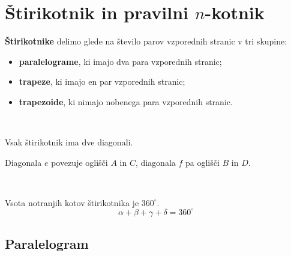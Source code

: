 \newpage

    \section{Štirikotnik in pravilni $n$-kotnik}

                 
                \textbf{Štirikotnike} delimo glede na število parov vzporednih stranic v tri skupine:
                \begin{itemize}
                    \item \textbf{paralelograme}, ki imajo dva para vzporednih stranic;
                    \item \textbf{trapeze}, ki imajo en par vzporednih stranic;
                    \item \textbf{trapezoide}, ki nimajo nobenega para vzporednih stranic.
                \end{itemize}
            
                ~
            
                Vsak štirikotnik ima dve diagonali. 

                Diagonala $e$ povezuje oglišči $A$ in $C$, diagonala $f$ pa oglišči $B$ in $D$.
            
                ~

            \begin{izrek}
                Vsota notranjih kotov štirikotnika je $360^\circ$. 
                $$\alpha + \beta + \gamma + \delta = 360^\circ$$
            \end{izrek}
        
            

        
            \subsection*{Paralelogram}
            
